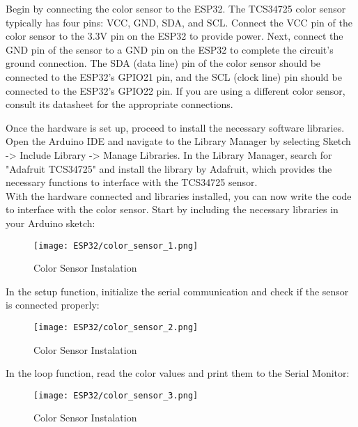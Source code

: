 Begin by connecting the color sensor to the ESP32. The TCS34725 color sensor typically has four pins: VCC, GND, SDA, and SCL. Connect the VCC pin of the color sensor to the 3.3V pin on the ESP32 to provide power. Next, connect the GND pin of the sensor to a GND pin on the ESP32 to complete the circuit's ground connection. The SDA (data line) pin of the color sensor should be connected to the ESP32’s GPIO21 pin, and the SCL (clock line) pin should be connected to the ESP32’s GPIO22 pin. If you are using a different color sensor, consult its datasheet for the appropriate connections.

Once the hardware is set up, proceed to install the necessary software libraries. Open the Arduino IDE and navigate to the Library Manager by selecting Sketch -> Include Library -> Manage Libraries. In the Library Manager, search for "Adafruit TCS34725" and install the library by Adafruit, which provides the necessary functions to interface with the TCS34725 sensor.
\\

With the hardware connected and libraries installed, you can now write the code to interface with the color sensor. Start by including the necessary libraries in your Arduino sketch:
\begin{figure}  
	\begin{center}
		\texttt{[image: ESP32/color\_sensor\_1.png]}
		\caption{Color Sensor Instalation} 
		\label{fig:Python 3.10.}
	\end{center}
\end{figure}	

In the setup function, initialize the serial communication and check if the sensor is connected properly:


\begin{figure}  
	\begin{center}
		\texttt{[image: ESP32/color\_sensor\_2.png]}
		\caption{Color Sensor Instalation} 
		\label{fig:Python 3.10.}
	\end{center}
\end{figure}	

In the loop function, read the color values and print them to the Serial Monitor:

\begin{figure}  
	\begin{center}
		\texttt{[image: ESP32/color\_sensor\_3.png]}
		\caption{Color Sensor Instalation} 
		\label{fig:Python 3.10.}
	\end{center}
\end{figure}	

